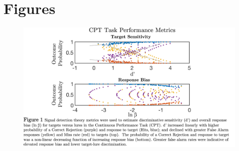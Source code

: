 \documentclass[utf8]{frontiersSCNS} %
\begin{document}
\section{Figures}
\begin{figure}[h!]
\includegraphics[width=\textwidth,height=\textheight,keepaspectratio]{Fig-1}
\caption{\label{fig:1}}
\end{figure}
\end{document}
